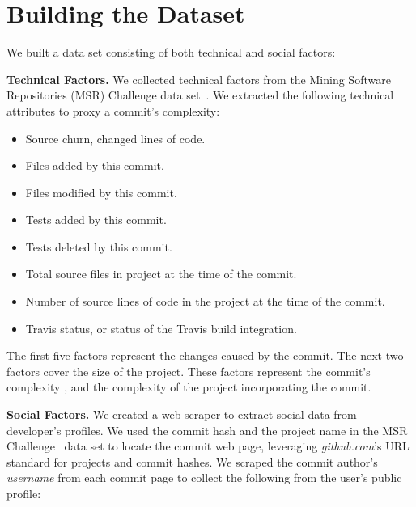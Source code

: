 \documentclass[10pt, conference]{IEEEtran}
\begin{document}
\section{Building the Dataset}
\label{approach}

We built a data set consisting of both technical and social factors:

\vspace{1ex}
\noindent\textbf{Technical Factors.} We collected technical factors from the 
Mining Software Repositories (MSR) Challenge data set~\cite{msr17challenge}.
We extracted the following technical attributes to proxy a commit's
complexity: 
\begin{itemize}
\item Source churn, changed lines of code.
\item Files added by this commit.
\item Files modified by this commit.
\item Tests added by this commit.
\item Tests deleted by this commit.
\item Total source files in project at the time of the commit.
\item Number of source lines of code in the project at
	the time of the commit.
\item Travis status, or status of the Travis build integration.
\end{itemize}

The first five factors represent the changes caused by the commit.  The next two
factors cover the size of the project.  These factors represent the commit's complexity
, and the complexity of the project incorporating the commit. 

\vspace{1ex}
\noindent\textbf{Social Factors.} We created a web scraper to extract social data
from developer's profiles.
We used the commit hash and the project name in the 
MSR Challenge~\cite{msr17challenge} data set to locate the
commit web page, leveraging \textit{github.com}'s URL standard for projects and
commit hashes.
%
We scraped the commit author's
\textit{username} from each commit page to
collect the following from the user's public profile:
%
\end{document}
